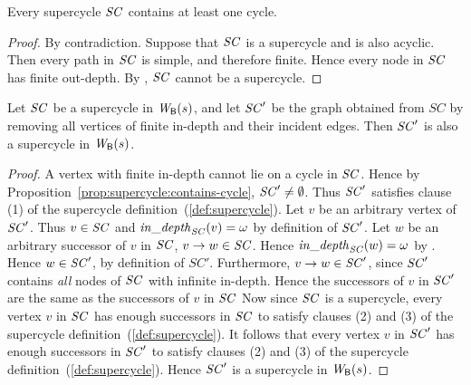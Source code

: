 \begin{proposition} \label{prop:supercycle:contains-cycle}
Every supercycle $\mathit{SC}$ contains at least one cycle.
\end{proposition} 
%
\begin{proof}
By contradiction. Suppose that $\mathit{SC}$ is a supercycle and is also acyclic. Then every path in $\mathit{SC}$ is simple, and therefore finite.  Hence every
node in $\mathit{SC}$ has finite out-depth. By , $\mathit{SC}$ cannot be a supercycle.
\end{proof}


\begin{proposition} \label{prop:supercycle:essential-subgraph-of} 
Let $\mathit{SC}$ be a supercycle in $\mathit{W}_{\mathsf{B}}({s})$, and let $\mathit{SC}'$ be the
graph obtained from $SC$ by removing all vertices of finite in-depth
and their incident edges. Then $\mathit{SC}'$ is also a supercycle in
$\mathit{W}_{\mathsf{B}}({s})$. 
\end{proposition} 
%
\begin{proof}
A vertex with finite in-depth cannot lie on a cycle in $\mathit{SC}$.  Hence
by Proposition~\ref{prop:supercycle:contains-cycle}, $\mathit{SC}' \neq
\emptyset$. Thus $\mathit{SC}'$ satisfies clause (1) of the supercycle
definition~(\ref{def:supercycle}).
%
Let $v$ be an arbitrary vertex of $\mathit{SC}'$.  Thus $v \in \mathit{SC}$ and $\mathit{in\_depth}_{\mathit{SC}}({v}) = \omega$ by definition of $\mathit{SC}'$. Let
$w$ be an arbitrary successor of $v$ in $\mathit{SC}$, \ie $v \rightarrow w \in \mathit{SC}$.
Hence $\mathit{in\_depth}_{\mathit{SC}}({w}) = \omega$ by . Hence $w \in \mathit{SC}'$, by definition of $SC'$.
Furthermore, $v \rightarrow w \in \mathit{SC}'$, since $\mathit{SC}'$ contains
\emph{all} nodes of $\mathit{SC}$ with infinite in-depth. Hence the successors of $v$ in $\mathit{SC}'$ are
the same as the successors of $v$ in $\mathit{SC}$
%
Now since $\mathit{SC}$ is a supercycle, every vertex $v$ in $\mathit{SC}$ has enough successors in $\mathit{SC}$ to satisfy clauses (2) and (3)
of the supercycle definition~(\ref{def:supercycle}). It follows that every vertex $v$ in $\mathit{SC}'$ has enough successors in
$\mathit{SC}'$ to satisfy clauses (2) and (3) of the supercycle definition~(\ref{def:supercycle}).  
Hence $\mathit{SC}'$ is a supercycle in $\mathit{W}_{\mathsf{B}}({s})$. 
\end{proof}

